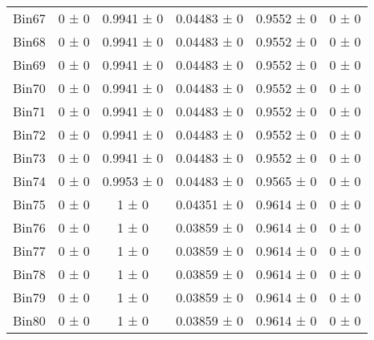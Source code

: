 \begin{tabular}{@{\extracolsep{4pt}}lccccc@{}}
     Bin67 & 0 ± 0 & 0.9941 ± 0 & 0.04483 ± 0 & 0.9552 ± 0 & 0 ± 0 \\ 
     Bin68 & 0 ± 0 & 0.9941 ± 0 & 0.04483 ± 0 & 0.9552 ± 0 & 0 ± 0 \\ 
     Bin69 & 0 ± 0 & 0.9941 ± 0 & 0.04483 ± 0 & 0.9552 ± 0 & 0 ± 0 \\ 
     Bin70 & 0 ± 0 & 0.9941 ± 0 & 0.04483 ± 0 & 0.9552 ± 0 & 0 ± 0 \\ 
     Bin71 & 0 ± 0 & 0.9941 ± 0 & 0.04483 ± 0 & 0.9552 ± 0 & 0 ± 0 \\ 
     Bin72 & 0 ± 0 & 0.9941 ± 0 & 0.04483 ± 0 & 0.9552 ± 0 & 0 ± 0 \\ 
     Bin73 & 0 ± 0 & 0.9941 ± 0 & 0.04483 ± 0 & 0.9552 ± 0 & 0 ± 0 \\ 
     Bin74 & 0 ± 0 & 0.9953 ± 0 & 0.04483 ± 0 & 0.9565 ± 0 & 0 ± 0 \\ 
     Bin75 & 0 ± 0 & 1 ± 0 & 0.04351 ± 0 & 0.9614 ± 0 & 0 ± 0 \\ 
     Bin76 & 0 ± 0 & 1 ± 0 & 0.03859 ± 0 & 0.9614 ± 0 & 0 ± 0 \\ 
     Bin77 & 0 ± 0 & 1 ± 0 & 0.03859 ± 0 & 0.9614 ± 0 & 0 ± 0 \\ 
     Bin78 & 0 ± 0 & 1 ± 0 & 0.03859 ± 0 & 0.9614 ± 0 & 0 ± 0 \\ 
     Bin79 & 0 ± 0 & 1 ± 0 & 0.03859 ± 0 & 0.9614 ± 0 & 0 ± 0 \\ 
     Bin80 & 0 ± 0 & 1 ± 0 & 0.03859 ± 0 & 0.9614 ± 0 & 0 ± 0 \\ 
\hline\hline
  \end{tabular}
